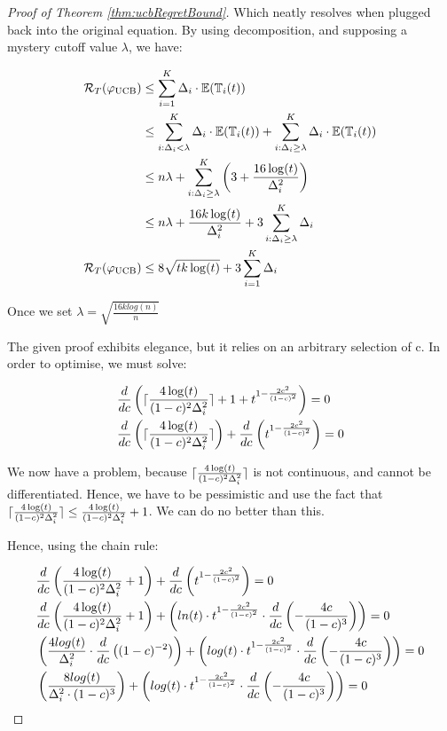 \begin{proof}[Proof of Theorem \ref{thm:ucbRegretBound}]
Which neatly resolves when plugged back into the original equation. By using decomposition, and supposing a mystery cutoff value $\lambda$, we have:

\begin{align*}
\mathcal{R}_{T}(\varphi_{\mathrm{UCB}}) &\leq \sum_{i=1}^{K} \Delta_{i} \cdot \mathbb{E}(\mathbb{T}_{i}(t)) \\
&\leq \sum_{i: \Delta_{i} < \lambda}^{K} \Delta_{i} \cdot \mathbb{E}(\mathbb{T}_{i}(t)) + \sum_{i: \Delta_{i} \geq \lambda}^{K} \Delta_{i} \cdot \mathbb{E}(\mathbb{T}_{i}(t)) \\
&\leq n \lambda + \sum_{i: \Delta_{i} \geq \lambda}^{K} \left( 3 + \frac{16\log(t)}{\Delta_{i}^2} \right)  \\
&\leq n \lambda + \frac{16k\log(t)}{\Delta_{i}^2} + 3 \sum_{i: \Delta_{i} \geq \lambda}^{K} \Delta_{i} \\
\mathcal{R}_{T}(\varphi_{\mathrm{UCB}}) &\leq 8 \sqrt{tk \log(t)} + 3 \sum_{i=1}^{K} \Delta_{i} 
\end{align*}

Once we set $\lambda = \sqrt{\frac{16klog(n)}{n}}$ 

The given proof exhibits elegance, but it relies on an arbitrary selection of c. In order to optimise, we must solve:

\begin{align*}
& \frac{d}{dc} \left( \lceil \frac{4\log(t)}{(1-c)^2\Delta_{i}^2} \rceil + 1 + t^{1 - \frac{2c^2}{(1-c)^2}} \right) = 0 \\
& \frac{d}{dc} \left( \lceil \frac{4\log(t)}{(1-c)^2\Delta_{i}^2} \rceil \right) + \frac{d}{dc} \left(t^{1 - \frac{2c^2}{(1-c)^2}} \right) = 0 \\
\end{align*}

We now have a problem, because $\lceil \frac{4\log(t)}{(1-c)^2\Delta_{i}^2} \rceil$ is not continuous, and cannot be differentiated. Hence, we have to be pessimistic and use the fact that $\lceil \frac{4\log(t)}{(1-c)^2\Delta_{i}^2} \rceil \leq \frac{4\log(t)}{(1-c)^2\Delta_{i}^2} + 1$. We can do no better than this.

Hence, using the chain rule:

\begin{align*}
& \frac{d}{dc} \left( \frac{4\log(t)}{(1-c)^2\Delta_{i}^2} + 1\right) + \frac{d}{dc} \left(t^{1 - \frac{2c^2}{(1-c)^2}} \right) = 0 \\
& \frac{d}{dc} \left( \frac{4\log(t)}{(1-c)^2\Delta_{i}^2} + 1\right) + \left(ln(t) \cdot t^{1 - \frac{2c^2}{(1-c)^2}} \cdot \frac{d}{dc} \left( -\frac{4c}{(1-c)^3} \right) \right) = 0 \\
& \left( \frac{4log(t)}{\Delta_{i}^2} \cdot \frac{d}{dc} \left( (1-c)^{-2} \right) \right) + \left(log(t) \cdot t^{1 - \frac{2c^2}{(1-c)^2}} \cdot \frac{d}{dc} \left( -\frac{4c}{(1-c)^3} \right) \right) = 0 \\
& \left( \frac{8log(t)}{\Delta_{i}^2 \cdot (1-c)^3} \right) + \left(log(t) \cdot t^{1 - \frac{2c^2}{(1-c)^2}} \cdot \frac{d}{dc} \left( -\frac{4c}{(1-c)^3} \right) \right) = 0 \\
\end{align*}


\end{proof}